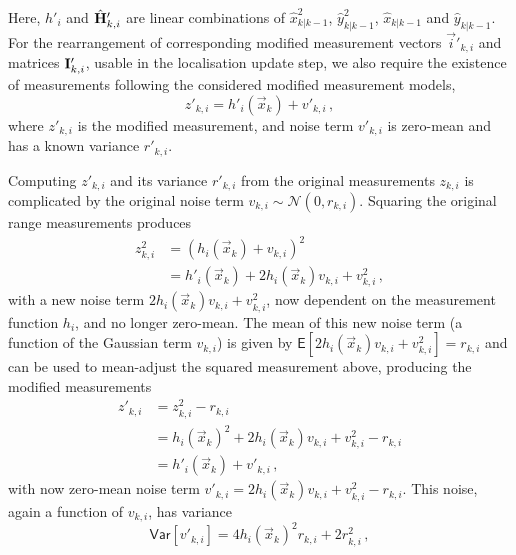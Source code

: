Here, $h'_i$ and $\hat{{{\mathbf{H}}}}'_{k,i}$ are linear combinations of $\hat{x}_{k|k-1}^2$, $\hat{y}_{k|k-1}^2$, $\hat{x}_{k|k-1}$ and $\hat{y}_{k|k-1}$. For the rearrangement of corresponding modified measurement vectors $\vec{i}'_{k, i}$ and matrices ${{\mathbf{I}}}'_{k, i}$, usable in the localisation update step, we also require the existence of measurements following the considered modified measurement models,
\begin{equation}\label{eq:nonlin_fusion:modified_measurement_model}
    z'_{k,i} = h'_i(\vec{x}_k)+v'_{k,i}\,,
\end{equation}
where $z'_{k,i}$ is the modified measurement, and noise term $v'_{k,i}$ is zero-mean and has a known variance $r'_{k,i}$.

Computing $z'_{k,i}$ and its variance $r'_{k,i}$ from the original measurements $z_{k,i}$ is complicated by the original noise term $v_{k,i} \sim \mathcal{N}(0, r_{k,i})$. Squaring the original range measurements produces
\begin{equation}
    \begin{split}
        z_{k,i}^2 &= (h_i(\vec{x}_k) + v_{k,i})^2 \\
        &= h'_i(\vec{x}_k) + 2h_i(\vec{x}_k)v_{k,i} + v_{k,i}^2\,,
    \end{split}
\end{equation}
with a new noise term $2h_i(\vec{x}_k)v_{k,i} + v_{k,i}^2$, now dependent on the measurement function $h_i$, and no longer zero-mean. The mean of this new noise term (a function of the Gaussian term $v_{k, i}$) is given by $\mathsf{E}[2h_i(\vec{x}_k)v_{k, i} + v_{k, i}^2] = r_{k, i}$ and can be used to mean-adjust the squared measurement above, producing the modified measurements
\begin{equation}\label{eq:nonlin_fusion:modified_measurement}
    \begin{split}
        z'_{k,i} &= z_{k,i}^2 - r_{k,i} \\
        &= h_i(\vec{x}_k)^2 + 2h_i(\vec{x}_k)v_{k,i} + v_{k,i}^2 - r_{k,i} \\
        &= h'_i(\vec{x}_k) + v'_{k,i}\,,
    \end{split}
\end{equation}
with now zero-mean noise term $v'_{k,i} = 2h_i(\vec{x}_k)v_{k,i} + v_{k,i}^2 - r_{k,i}$. This noise, again a function of $v_{k,i}$, has variance 
\begin{equation}\label{eq:nonlin_fusion:modified_measurement_variance}
    \mathsf{Var}[v'_{k,i}] = 4h_i(\vec{x}_k)^2r_{k,i} + 2r_{k,i}^2\,,
\end{equation}

